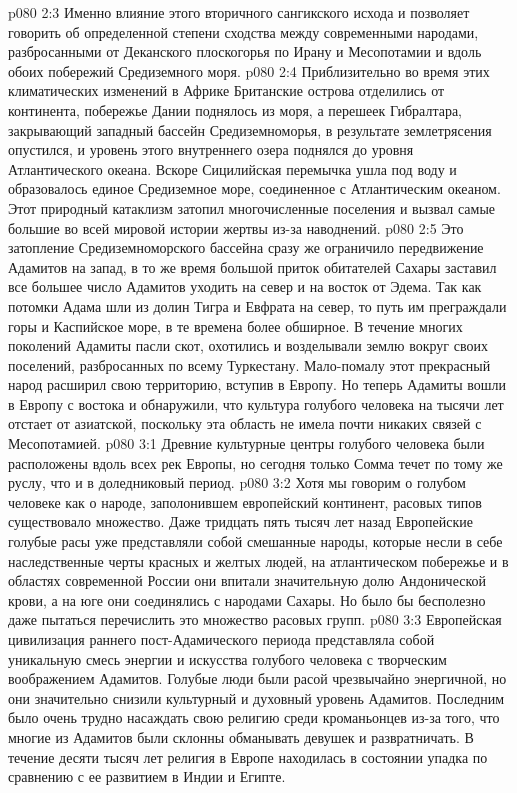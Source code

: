 \vs p080 2:3 Именно влияние этого вторичного сангикского исхода и позволяет говорить об определенной степени сходства между современными народами, разбросанными от Деканского плоскогорья по Ирану и Месопотамии и вдоль обоих побережий Средиземного моря.
\vs p080 2:4 \pc Приблизительно во время этих климатических изменений в Африке Британские острова отделились от континента, побережье Дании поднялось из моря, а перешеек Гибралтара, закрывающий западный бассейн Средиземноморья, в результате землетрясения опустился, и уровень этого внутреннего озера поднялся до уровня Атлантического океана. Вскоре Сицилийская перемычка ушла под воду и образовалось единое Средиземное море, соединенное с Атлантическим океаном. Этот природный катаклизм затопил многочисленные поселения и вызвал самые большие во всей мировой истории жертвы из\hyp{}за наводнений.
\vs p080 2:5 Это затопление Средиземноморского бассейна сразу же ограничило передвижение Адамитов на запад, в то же время большой приток обитателей Сахары заставил все большее число Адамитов уходить на север и на восток от Эдема. Так как потомки Адама шли из долин Тигра и Евфрата на север, то путь им преграждали горы и Каспийское море, в те времена более обширное. В течение многих поколений Адамиты пасли скот, охотились и возделывали землю вокруг своих поселений, разбросанных по всему Туркестану. Мало\hyp{}помалу этот прекрасный народ расширил свою территорию, вступив в Европу. Но теперь Адамиты вошли в Европу с востока и обнаружили, что культура голубого человека на тысячи лет отстает от азиатской, поскольку эта область не имела почти никаких связей с Месопотамией.
\vs p080 3:1 Древние культурные центры голубого человека были расположены вдоль всех рек Европы, но сегодня только Сомма течет по тому же руслу, что и в доледниковый период.
\vs p080 3:2 Хотя мы говорим о голубом человеке как о народе, заполонившем европейский континент, расовых типов существовало множество. Даже тридцать пять тысяч лет назад Европейские голубые расы уже представляли собой смешанные народы, которые несли в себе наследственные черты красных и желтых людей, на атлантическом побережье и в областях современной России они впитали значительную долю Андонической крови, а на юге они соединялись с народами Сахары. Но было бы бесполезно даже пытаться перечислить это множество расовых групп.
\vs p080 3:3 Европейская цивилизация раннего пост\hyp{}Адамического периода представляла собой уникальную смесь энергии и искусства голубого человека с творческим воображением Адамитов. Голубые люди были расой чрезвычайно энергичной, но они значительно снизили культурный и духовный уровень Адамитов. Последним было очень трудно насаждать свою религию среди кроманьонцев из\hyp{}за того, что многие из Адамитов были склонны обманывать девушек и развратничать. В течение десяти тысяч лет религия в Европе находилась в состоянии упадка по сравнению с ее развитием в Индии и Египте.
